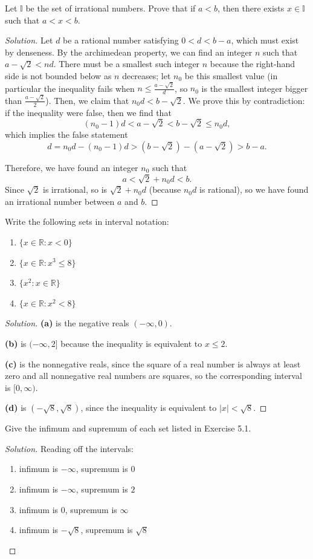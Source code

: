 \documentclass[11pt]{scrartcl}
\providecommand{\RR}{\mathbb R}
\providecommand{\ii}{\item}
\newenvironment{soln}{\begin{proof}[Solution]}{\end{proof}}
\begin{document}
\begin{problem*}[4.12]
	Let $\mathbb I$ be the set of irrational numbers. Prove that
	if $a < b$, then there exists $x\in\mathbb I$ such that $a < x < b$.
\end{problem*}
\begin{soln}
	Let $d$ be a rational number satisfying $0 < d < b - a$,
	which must exist by denseness.
	By the archimedean property, we can find an integer $n$ such that
	$a - \sqrt 2 < nd$. There must be a smallest such integer $n$
	because the right-hand side is not bounded below as $n$ decreases;
	let $n_0$ be this smallest value
	(in particular the inequality fails when $n \le \frac{a - \sqrt 2}{d}$,
	so $n_0$ is the smallest integer bigger than $\frac{a - \sqrt2}{2}$).
	Then, we claim that $n_0d < b - \sqrt 2$.
	We prove this by contradiction: if the inequality were false,
	then we find that
	\[(n_0 - 1)d < a - \sqrt2 < b - \sqrt2 \le n_0d,\]
	which implies the false statement
	\[d = n_0d - (n_0 - 1)d > (b - \sqrt2) - (a - \sqrt2) > b - a.\]
	
	Therefore, we have found an integer $n_0$ such that
	\[a < \sqrt2 + n_0d < b.\]
	Since $\sqrt2$ is irrational, so is $\sqrt2 + n_0d$
	(because $n_0d$ is rational), so we have found an irrational number
	between $a$ and $b$.
\end{soln}

\begin{problem*}[5.1]
	Write the following sets in interval notation:
	\begin{enumerate}[\textbf{(\alph*)}]
		\ii $\{x\in\RR : x < 0\}$
		\ii $\{x\in\RR : x^3 \le 8\}$
		\ii $\{x^2 : x\in\RR\}$
		\ii $\{x\in\RR : x^2 < 8\}$
	\end{enumerate}
\end{problem*}
\begin{soln}
	\textbf{(a)} is the negative reals $(-\infty, 0)$.
	
	\textbf{(b)} is $(-\infty, 2]$ because the inequality is equivalent to
	$x \le 2$.
	
	\textbf{(c)} is the nonnegative reals, since the square of a real number
	is always at least zero and all nonnegative real numbers are squares,
	so the corresponding interval is $[0, \infty)$.
	
	\textbf{(d)} is $(-\sqrt8, \sqrt8)$, since the inequality is equivalent to
	$|x| < \sqrt 8$.
\end{soln}

\begin{problem*}[5.2]
	Give the infimum and supremum of each set listed in Exercise 5.1.
\end{problem*}
\begin{soln}
	Reading off the intervals:
	\begin{enumerate}[\textbf{(\alph*)}]
		\ii infimum is $-\infty$, supremum is $0$
		\ii infimum is $-\infty$, supremum is $2$
		\ii infimum is $0$, supremum is $\infty$
		\ii infimum is $-\sqrt8$, supremum is $\sqrt8$
	\end{enumerate}
\end{soln}
\end{document}

